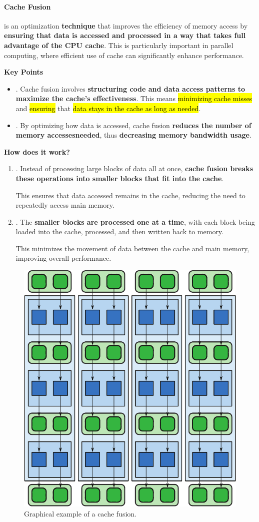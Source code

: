 \paragraph{Cache Fusion}

 is an optimization \textbf{technique} that improves the efficiency of memory access by \textbf{ensuring that data is accessed and processed in a way that takes full advantage of the CPU cache}. This is particularly important in parallel computing, where efficient use of cache can significantly enhance performance.

\highspace
\begin{flushleft}
    \textcolor{Green3}{ \textbf{Key Points}}
\end{flushleft}
\begin{itemize}
    \item {}. Cache fusion involves \textbf{structuring code and data access patterns to maximize the cache's effectiveness}. This means \hl{minimizing cache misses} and \hl{ensuring} that \hl{data stays in the cache as long as needed}.
    
    \item {}. By optimizing how data is accessed, cache fusion \textbf{reduces the number of memory accesses\break needed}, thus \textbf{decreasing memory bandwidth usage}.
\end{itemize}

\highspace
\begin{flushleft}
    \textcolor{Green3}{ \textbf{How does it work?}}
\end{flushleft}
\begin{enumerate}
    \item {}. Instead of processing large blocks of data all at once, \textbf{cache fusion breaks these operations into smaller blocks that fit into the cache}.

    \textcolor{Green3}{} This ensures that data accessed remains in the cache, reducing the need to repeatedly access main memory.


    \item {}. The \textbf{smaller blocks are processed one at a time}, with each block being loaded into the cache, processed, and then written back to memory.

    \textcolor{Green3}{} This minimizes the movement of data between the cache and main memory, improving overall performance.
\end{enumerate}

\begin{figure}[!htp]
    \centering
    \includegraphics[width=.4\textwidth]{img/cache-fusion-1.pdf}
    \caption{Graphical example of a cache fusion.}
\end{figure}